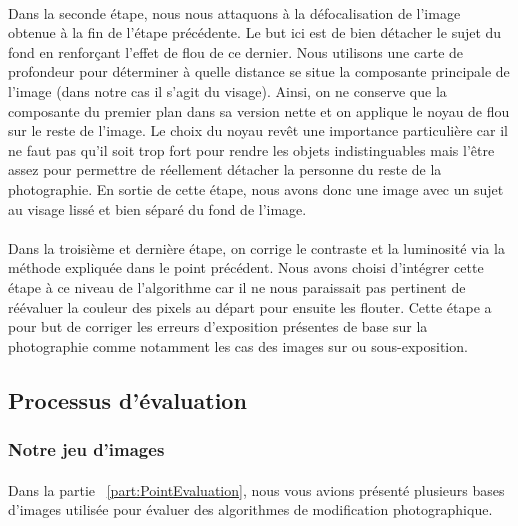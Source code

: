 \documentclass[11pt, french,screen]{report-rd-info}
\begin{document}
\paragraph*{}
Dans la seconde étape, nous nous attaquons à la défocalisation de l'image obtenue à la fin de l'étape précédente. Le but ici est de bien détacher le sujet du fond en renforçant l'effet de flou de ce dernier.
Nous utilisons une carte de profondeur \cite{Zhuo2011} pour déterminer à quelle distance se situe la composante principale de l'image (dans notre cas il s'agit du visage).
Ainsi, on ne conserve que la composante du premier plan dans sa version nette et on applique le noyau de flou sur le reste de l'image.
Le choix du noyau revêt une importance particulière car il ne faut pas qu'il soit trop fort pour rendre les objets indistinguables mais l'être assez pour permettre de réellement détacher la personne du reste de la photographie.
En sortie de cette étape, nous avons donc une image avec un sujet au visage lissé et bien séparé du fond de l'image.
\paragraph*{}
Dans la troisième et dernière étape, on corrige le contraste et la luminosité via la méthode expliquée dans le point précédent. 
Nous avons choisi d'intégrer cette étape à ce niveau de l'algorithme car il ne nous paraissait pas pertinent de réévaluer la couleur des pixels au départ pour ensuite les flouter.
Cette étape a pour but de corriger les erreurs d'exposition présentes de base sur la photographie comme notamment les cas des images sur ou sous-exposition. 

\subsection{Processus d'évaluation}
\label{part:evaluation}
\subsubsection{Notre jeu d'images}
\paragraph*{}
Dans la partie ~\ref{part:PointEvaluation}, nous vous avions présenté plusieurs bases d'images utilisée pour évaluer des algorithmes de modification photographique.
\end{document}
